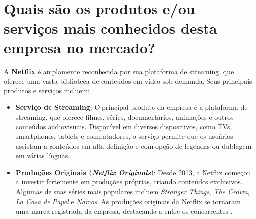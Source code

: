 \section{Quais são os produtos e/ou serviços mais conhecidos desta empresa no mercado?}

A \textbf{Netflix} é amplamente reconhecida por sua plataforma de streaming, que oferece uma vasta biblioteca de conteúdos em vídeo sob demanda. Seus principais produtos e serviços incluem:

\begin{itemize}
    \item \textbf{Serviço de Streaming}: O principal produto da empresa é a plataforma de streaming, que oferece filmes, séries, documentários, animações e outros conteúdos audiovisuais. Disponível em diversos dispositivos, como TVs, smartphones, tablets e computadores, o serviço permite que os usuários assistam a conteúdos em alta definição e com opção de legendas ou dublagem em várias línguas.

    \item \textbf{Produções Originais (\textit{Netflix Originals})}: Desde 2013, a Netflix começou a investir fortemente em produções próprias, criando conteúdos exclusivos. Algumas de suas séries mais populares incluem \textit{Stranger Things}, \textit{The Crown}, \textit{La Casa de Papel} e \textit{Narcos}. As produções originais da Netflix se tornaram uma marca registrada da empresa, destacando-a entre os concorrentes \cite{netflix_servicos}.

\end{itemize}
